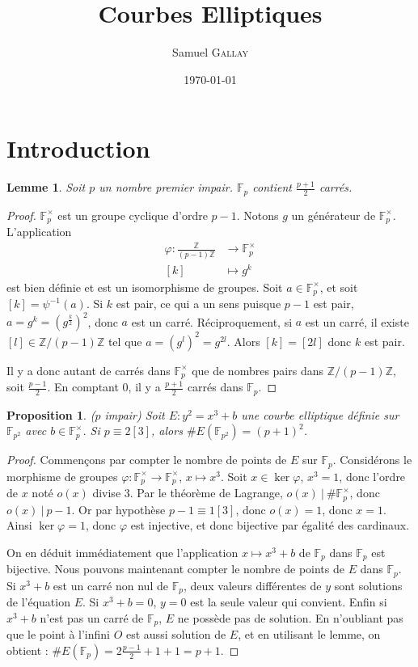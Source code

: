 \documentclass{article}
\title{Courbes Elliptiques}
\author{Samuel \textsc{Gallay}}
\date{\today}
\newtheorem{prop}{Proposition}
\newtheorem{lem}{Lemme}
\newcommand{\Fp}{\mathbb{F}_{p}}
\newcommand{\Fq}{\mathbb{F}_{p^2}}
\newcommand{\Z}{\mathbb{Z}}
\begin{document}
\maketitle



\section{Introduction}

\begin{lem}
  Soit $p$ un nombre premier impair. $\Fp$ contient $\frac{p+1}{2}$ carrés.
\end{lem}

\begin{proof}
  $\Fp^\times$ est un groupe cyclique d'ordre $p-1$. 
  Notons $g$ un générateur de $\Fp^\times$. L'application 
  \begin{align*}
    \varphi \colon \frac{\Z}{(p-1)\Z} &\to \Fp^\times\\
    [k] &\mapsto g^k
  \end{align*}
  est bien définie et est un isomorphisme de groupes.
  Soit $a\in \Fp^\times$, et soit $[k] = \psi^{-1}(a)$.
  Si $k$ est pair, ce qui a un sens puisque $p-1$ est pair, $a = g^k = (g^\frac{k}{2})^2$, donc $a$ est un carré.
  Réciproquement, si $a$ est un carré, il existe $[l]\in \Z/(p-1)\Z$ tel que $a = (g^l)^2 = g^{2l}$.
  Alors $[k] = [2l]$ donc $k$ est pair.

  Il y a donc autant de carrés dans $\Fp^\times$ que de nombres pairs dans $\Z/(p-1)\Z$, soit $\frac{p-1}{2}$. 
  En comptant $0$, il y a $\frac{p+1}{2}$ carrés dans $\Fp$. 
\end{proof}

\begin{prop}
  ($p$ impair)
Soit $E : y^2 = x^3 + b$ une courbe elliptique définie sur $\Fq$ avec $b \in \Fp^{\times}$.
Si $p \equiv 2 [3]$, alors $\#E(\Fq) = (p+1)^2$.
\end{prop}

\begin{proof}
  Commençons par compter le nombre de points de $E$ sur $\Fp$. 
  Considérons le morphisme de groupes $\varphi \colon \Fp^\times \to \Fp^\times$, $x \mapsto x^3$. 
  Soit $x\in \ker \varphi$, $x^3 = 1$, donc l'ordre de $x$ noté $o(x)$ divise $3$. 
  Par le théorème de Lagrange, $o(x)\ |\ \#\Fp^\times$, donc $o(x)\ |\ p-1$. 
  Or par hypothèse $p-1\equiv 1[3]$, donc $o(x) = 1$, donc $x = 1$.
  Ainsi $\ker \varphi = {1}$, donc $\varphi$ est injective, et donc bijective par égalité des cardinaux.

  On en déduit immédiatement que l'application $x \mapsto x^3 + b$ de $\Fp$ dans $\Fp$ est bijective.
  Nous pouvons maintenant compter le nombre de points de $E$ dans $\Fp$. 
  Si $x^3 + b$ est un carré non nul de $\Fp$, deux valeurs différentes de $y$ sont solutions de l'équation $E$. 
  Si $x^3 + b = 0$, $y = 0$ est la seule valeur qui convient.
  Enfin si $x^3 + b$ n'est pas un carré de $\Fp$, $E$ ne possède pas de solution.
  En n'oubliant pas que le point à l'infini $O$ est aussi solution de $E$, et en utilisant le lemme, on obtient : $\#E(\Fp) = 2\frac{p-1}{2} + 1 + 1 = p+1$.
\end{proof}
\end{document}
